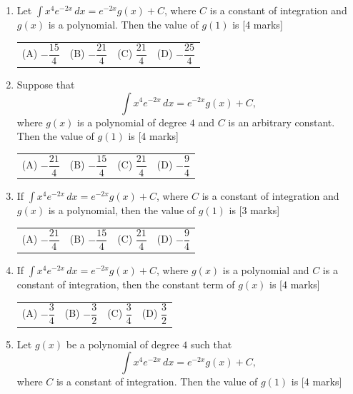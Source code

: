 \documentclass[11pt,a4paper]{article}
\begin{document}
\begin{enumerate}[resume]
{\begin{tabularx}{\linewidth}{X X X X}
\end{tabularx}}
\item Let \(\displaystyle \int x^{4}e^{-2x}\,dx=e^{-2x}g(x)+C\), where \(C\) is a constant of integration and \(g(x)\) is a polynomial. Then the value of \(g(1)\) is \hfill [4 marks]
{\renewcommand{\arraystretch}{1.8}
\begin{tabularx}{\linewidth}{X X X X}
(A) \quad \(-\dfrac{15}{4}\) & (B) \quad \(-\dfrac{21}{4}\) & (C) \quad \(\dfrac{21}{4}\) & (D) \quad \(-\dfrac{25}{4}\) \\[10pt]
\end{tabularx}}
\item Suppose that
\[
\int x^{4}e^{-2x}\,dx=e^{-2x}g(x)+C,
\]
where \(g(x)\) is a polynomial of degree \(4\) and \(C\) is an arbitrary constant. Then the value of \(g(1)\) is \hfill [4 marks]
{\renewcommand{\arraystretch}{1.8}
\begin{tabularx}{\linewidth}{X X X X}
(A) \quad \(-\dfrac{21}{4}\) & (B) \quad \(-\dfrac{15}{4}\) & (C) \quad \(\dfrac{21}{4}\) & (D) \quad \(-\dfrac{9}{4}\) \\[10pt]
\end{tabularx}}
\item If \(\displaystyle \int x^{4}e^{-2x}\,dx=e^{-2x}g(x)+C\), where \(C\) is a constant of integration and \(g(x)\) is a polynomial, then the value of \(g(1)\) is \hfill [3 marks]
{\renewcommand{\arraystretch}{1.8}
\begin{tabularx}{\linewidth}{X X X X}
(A) \quad \(-\dfrac{21}{4}\) & (B) \quad \(-\dfrac{15}{4}\) & (C) \quad \(\dfrac{21}{4}\) & (D) \quad \(-\dfrac{9}{4}\) \\[10pt]
\end{tabularx}}
\item If \(\displaystyle \int x^{4}e^{-2x}\,dx=e^{-2x}g(x)+C\), where \(g(x)\) is a polynomial and \(C\) is a constant of integration, then the constant term of \(g(x)\) is \hfill [4 marks]
{\renewcommand{\arraystretch}{1.8}
\begin{tabularx}{\linewidth}{X X X X}
(A) \quad \(-\dfrac{3}{4}\) & (B) \quad \(-\dfrac{3}{2}\) & (C) \quad \(\dfrac{3}{4}\) & (D) \quad \(\dfrac{3}{2}\) \\[10pt]
\end{tabularx}}
\item Let \(g(x)\) be a polynomial of degree \(4\) such that
\[
\int x^4e^{-2x}\,dx=e^{-2x}g(x)+C,
\]
where \(C\) is a constant of integration. Then the value of \(g(1)\) is \hfill [4 marks]
{\renewcommand{\arraystretch}{1.8}
\begin{tabularx}{\linewidth}{X X X X}

\end{tabularx}}
\end{enumerate}
\end{document}
